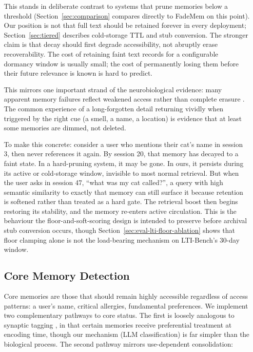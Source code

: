 \documentclass[11pt,a4paper]{article}
\begin{document}
This stands in deliberate contrast to systems that prune memories below a threshold (Section~\ref{sec:comparison} compares directly to FadeMem on this point). Our position is not that full text should be retained forever in every deployment; Section~\ref{sec:tiered} describes cold-storage TTL and stub conversion. The stronger claim is that decay should first degrade accessibility, not abruptly erase recoverability. The cost of retaining faint text records for a configurable dormancy window is usually small; the cost of permanently losing them before their future relevance is known is hard to predict.

This mirrors one important strand of the neurobiological evidence: many apparent memory failures reflect weakened access rather than complete erasure \citep{wixted2004psychology}. The common experience of a long-forgotten detail returning vividly when triggered by the right cue (a smell, a name, a location) is evidence that at least some memories are dimmed, not deleted.

To make this concrete: consider a user who mentions their cat's name in session 3, then never references it again. By session 20, that memory has decayed to a faint state. In a hard-pruning system, it may be gone. In ours, it persists during its active or cold-storage window, invisible to most normal retrieval. But when the user asks in session 47, ``what was my cat called?'', a query with high semantic similarity to exactly that memory can still surface it because retention is softened rather than treated as a hard gate. The retrieval boost then begins restoring its stability, and the memory re-enters active circulation. This is the behaviour the floor-and-soft-scoring design is intended to preserve before archival stub conversion occurs, though Section~\ref{sec:eval-lti-floor-ablation} shows that floor clamping alone is not the load-bearing mechanism on LTI-Bench's 30-day window.

\subsection{Core Memory Detection}
\label{sec:core}

Core memories are those that should remain highly accessible regardless of access patterns: a user's name, critical allergies, fundamental preferences. We implement two complementary pathways to core status. The first is loosely analogous to synaptic tagging \citep{frey1997synaptic}, in that certain memories receive preferential treatment at encoding time, though our mechanism (LLM classification) is far simpler than the biological process. The second pathway mirrors use-dependent consolidation:
\end{document}
